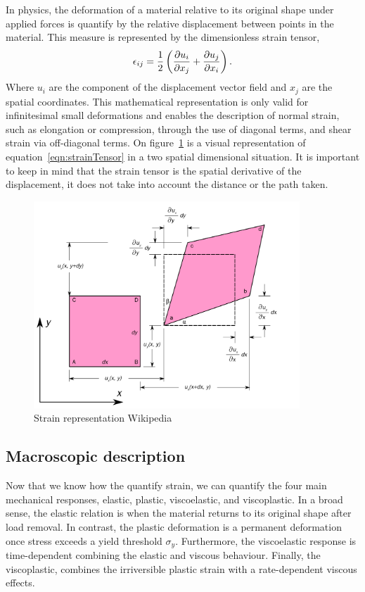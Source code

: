 In physics, the deformation of a material relative to its original shape under applied forces is quantify by the relative displacement between points in the material.
This measure is represented by the dimensionless strain tensor,
\begin{gather}
    \epsilon_{ij} = \frac{1}{2}\left( \pdv{u_i}{x_j}+\pdv{u_j}{x_i} \right).\label{eqn:strainTensor}
\end{gather}
Where $u_i$ are the component of the displacement vector field and $x_j$ are the spatial coordinates.
This mathematical representation is only valid for infinitesimal small deformations and enables the description of normal strain, such as elongation or compression, through the use of diagonal terms, and shear strain via off-diagonal terms.
On figure~\ref{fig:strainTensor} is a visual representation of equation~\eqref{eqn:strainTensor} in a two spatial dimensional situation.
It is important to keep in mind that the strain tensor is the spatial derivative of the displacement, it does not take into account the distance or the path taken.

\begin{figure}[ht!]
    \centering
    \includegraphics[width=10cm]{figs/2D_geometric_strain.png}
    \caption{Strain representation Wikipedia}\label{fig:strainTensor}
\end{figure}

\subsection{Macroscopic description}

Now that we know how the quantify strain, we can quantify the four main mechanical responses,
    elastic,
    plastic,
    viscoelastic,
    and viscoplastic.
In a broad sense, the elastic relation is when the material returns to its original shape after load removal.
In contrast, the plastic deformation is a permanent deformation once stress exceeds a yield threshold $\sigma_y$.
Furthermore, the viscoelastic response is time-dependent combining the elastic and viscous behaviour.
Finally, the viscoplastic, combines the irriversible plastic strain with a rate-dependent viscous effects.

